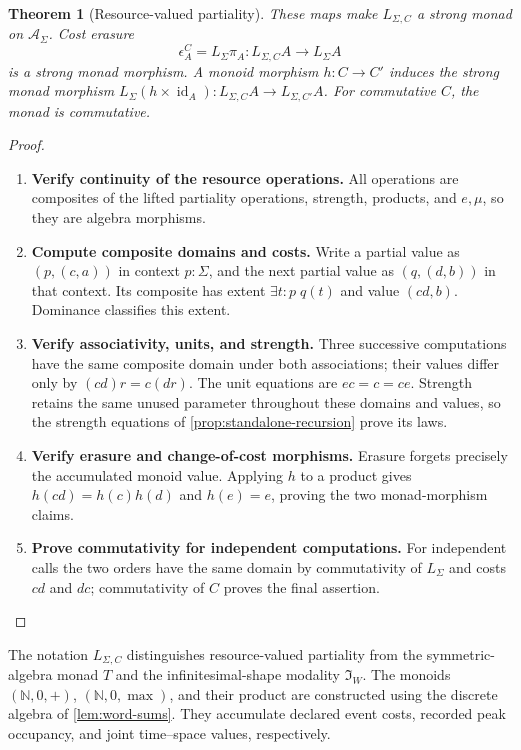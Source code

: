 \documentclass[11pt,a4paper]{article}
\numberwithin{algorithm}{section}
\numberwithin{equation}{section}
\newtheorem{theorem}{Theorem}[section]
\theoremstyle{definition}
\theoremstyle{remark}
\theoremstyle{plain}
\newcommand{\N}{\mathbb N}
\newcommand{\AS}{\mathcal A_{\Sigma}}
\newcommand{\LL}{L_{\Sigma}}
\newcommand{\LC}{L_{\Sigma,C}}
\newcommand{\id}{\operatorname{id}}
\newcommand{\Shape}{\mathfrak I_W}
\theoremstyle{definition}
\theoremstyle{plain}
\begin{document}
\begin{theorem}[Resource-valued partiality]\label{thm:cost-partiality}
These maps make $\LC$ a strong monad on $\AS$. Cost erasure
\[
 \epsilon^C_A=\LL\pi_A:\LC A\to\LL A
\]
is a strong monad morphism. A monoid morphism $h:C\to C'$ induces the
strong monad morphism $\LL(h\times\id_A):\LC A\to L_{\Sigma,C'}A$.
For commutative $C$, the monad is commutative.
\end{theorem}
\begin{proof}\leavevmode
\begin{enumerate}[leftmargin=*,align=left]
\item \textbf{Verify continuity of the resource operations.}
All operations are composites of the lifted partiality operations,
strength, products, and $e,\mu$, so they are algebra morphisms.

\item \textbf{Compute composite domains and costs.}
Write a partial value as $(p,(c,a))$ in context $p:\Sigma$, and the next
partial value as $(q,(d,b))$ in that context. Its composite has extent
$\exists t:p\;q(t)$ and value $(cd,b)$. Dominance classifies this extent.

\item \textbf{Verify associativity, units, and strength.}
Three successive computations have the same composite domain under both
associations; their values differ only by $(cd)r=c(dr)$. The unit equations
are $ec=c=ce$. Strength retains the same unused parameter throughout
these domains and values, so the strength equations of \cref{prop:standalone-recursion} prove its
laws.

\item \textbf{Verify erasure and change-of-cost morphisms.}
Erasure forgets precisely the accumulated monoid value. Applying
$h$ to a product gives $h(cd)=h(c)h(d)$ and $h(e)=e$, proving the two
monad-morphism claims.

\item \textbf{Prove commutativity for independent computations.}
For independent calls the two orders have the same
domain by commutativity of $\LL$ and costs $cd$ and $dc$; commutativity of
$C$ proves the final assertion.
\end{enumerate}
\end{proof}

The notation $L_{\Sigma,C}$ distinguishes resource-valued partiality
from the symmetric-algebra monad $T$ and the infinitesimal-shape modality
$\Shape$. The monoids $(\N,0,+)$, $(\N,0,\max)$, and their product are
constructed using the discrete algebra of \cref{lem:word-sums}.
They accumulate declared event costs, recorded peak occupancy, and joint
time--space values, respectively.
\end{document}
